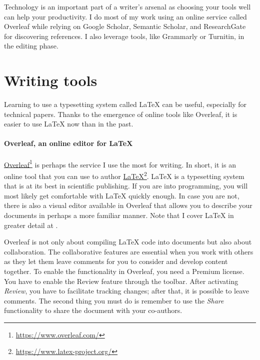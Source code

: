 Technology is an important part of a writer's arsenal as choosing your tools well can help your productivity.
I do most of my work using an online service called Overleaf while relying on Google Scholar, Semantic Scholar, and ResearchGate for discovering references.
I also leverage tools, like Grammarly or Turnitin, in the editing phase.

\section{Writing tools}

Learning to use a typesetting system called LaTeX can be useful, especially for technical papers.
Thanks to the emergence of online tools like Overleaf, it is easier to use LaTeX now than in the past.

\paragraph{Overleaf, an online editor for LaTeX}

\href{https://www.overleaf.com/}{Overleaf}\footnote{\url{https://www.overleaf.com/}} is perhaps the service I use the most for writing. In short, it is an online tool that you can use to author \href{https://www.latex-project.org/}{LaTeX}\footnote{\url{https://www.latex-project.org/}}.
LaTeX is a typesetting system that is at its best in scientific publishing.
If you are into programming, you will most likely get comfortable with LaTeX quickly enough.
In case you are not, there is also a visual editor available in Overleaf that allows you to describe your documents in perhaps a more familiar manner.
Note that I cover LaTeX in greater detail at .

Overleaf is not only about compiling LaTeX code into documents but also about collaboration.
The collaborative features are essential when you work with others as they let them leave comments for you to consider and develop content together.
To enable the functionality in Overleaf, you need a Premium license.
You have to enable the Review feature through the toolbar.
After activating \textit{Review}, you have to facilitate tracking changes; after that, it is possible to leave comments.
The second thing you must do is remember to use the \textit{Share} functionality to share the document with your co-authors.

